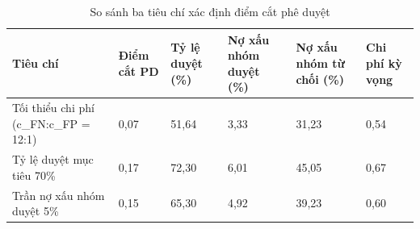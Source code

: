 \begin{table}[!htbp]
\centering
\caption{So sánh ba tiêu chí xác định điểm cắt phê duyệt}
\label{tab:cutoff}
\small
\setlength{\tabcolsep}{3.0pt}
\begin{tabular}{@{}L{4.255cm}R{1.850cm}R{1.850cm}R{2.220cm}R{2.220cm}R{1.850cm}@{}}
\toprule
\textbf{Tiêu chí} & \textbf{Điểm cắt PD} & \textbf{Tỷ lệ duyệt (\%)} & \textbf{Nợ xấu nhóm duyệt (\%)} & \textbf{Nợ xấu nhóm từ chối (\%)} & \textbf{Chi phí kỳ vọng} \\
\midrule
Tối thiểu chi phí (c\_\allowbreak FN:c\_\allowbreak FP = 12:1) & 0,07 & 51,64 & 3,33 & 31,23 & 0,54 \\
Tỷ lệ duyệt mục tiêu 70\% & 0,17 & 72,30 & 6,01 & 45,05 & 0,67 \\
Trần nợ xấu nhóm duyệt 5\% & 0,15 & 65,30 & 4,92 & 39,23 & 0,60 \\
\bottomrule
\end{tabular}
\end{table}
